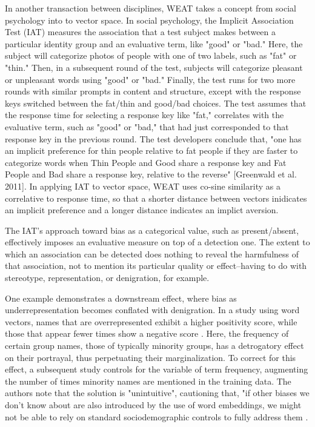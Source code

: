 \documentclass[11pt]{article}
\begin{document}
In another transaction between disciplines, WEAT takes a concept from
social psychology into to vector space. In social psychology, the
Implicit Association Test (IAT) \citep{greenwald:1998} measures the
association that a test subject makes between a particular identity
group and an evaluative term, like "good" or "bad." Here, the subject
will categorize photos of people with one of two labels, such as "fat"
or "thin." Then, in a subsequent round of the test, subjects will
categorize pleasant or unpleasant words using "good" or "bad."
Finally, the test runs for two more rounds with similar prompts in
content and structure, except with the response keys switched between
the fat/thin and good/bad choices. The test assumes that the response
time for selecting a response key like "fat," correlates with the
evaluative term, such as "good" or "bad," that had just corresponded
to that response key in the previous round. The test developers
conclude that, "one has an implicit preference for thin people
relative to fat people if they are faster to categorize words when
Thin People and Good share a response key and Fat People and Bad share
a response key, relative to the reverse" [Greenwald et al. 2011]. In
applying IAT to vector space, WEAT uses co-sine similarity as a
correlative to response time, so that a shorter distance between
vectors inidicates an implicit preference and a longer distance
indicates an implict aversion.

The IAT's approach toward bias as a categorical value, such as
present/absent, effectively imposes an evaluative measure on top of a
detection one. The extent to which an association can be detected does
nothing to reveal the harmfulness of that association, not to mention
its particular quality or effect--having to do with stereotype,
representation, or denigration, for example.

One example demonstrates a downstream effect, where bias as
underrepresentation becomes conflated with denigration. In a study
using word vectors, names that are overrepresented exhibit a higher
positivity score, while those that appear fewer times show a negative
score \citep{[wolfe:2021}. Here, the frequency of certain group names,
those of typically minority groups, has a detrogatory effect on their
portrayal, thus perpetuating their marginalization. To correct for
this effect, a subsequent study \citet{vanloon:2022} controls for the
variable of term frequency, augmenting the number of times minority
names are mentioned in the training data. The authors note that the
solution is "unintuitive", cautioning that, "if other biases we don’t
know about are also introduced by the use of word embeddings, we might
not be able to rely on standard sociodemographic controls to fully
address them \citep{vanloon:2022}.
\end{document}
